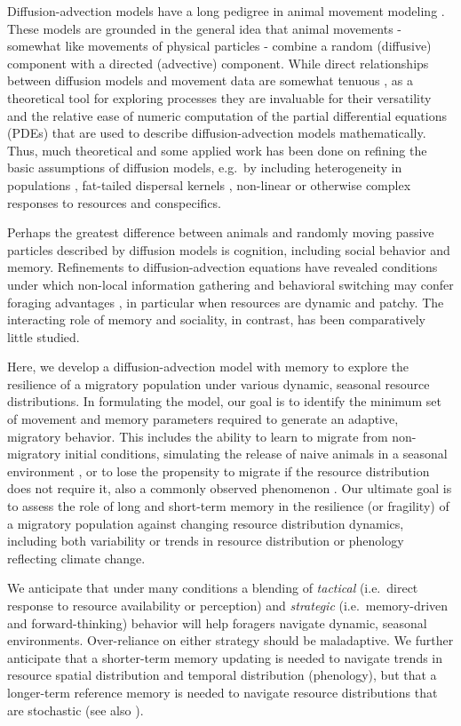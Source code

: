 \documentclass[12pt]{article}
\begin{document}
Diffusion-advection models have a long pedigree in animal movement modeling \citep{Skellam1951, Turchin1998, Okubo2001}. These models are grounded in the general idea that animal movements - somewhat like movements of physical particles - combine a random (diffusive) component with a directed (advective) component. While direct relationships between diffusion models and movement data are somewhat tenuous \citep{Gurarie2011}, as a theoretical tool for exploring processes they are invaluable for their versatility and the relative ease of numeric computation of the partial differential equations (PDEs) that are used to describe diffusion-advection models mathematically. Thus, much theoretical and some applied work has been done on refining the basic assumptions of diffusion models, e.g.~by including heterogeneity in populations \citep{Skalski2003, Gurarie2009}, fat-tailed dispersal kernels \citep{Kot1996}, non-linear or otherwise complex responses to resources and conspecifics.

Perhaps the greatest difference between animals and randomly moving passive particles described by diffusion models is cognition, including social behavior and memory. Refinements to diffusion-advection equations have revealed conditions under which non-local information gathering \citep{Fagan2017} and behavioral switching may confer foraging advantages \citep{Fagan2019}, in particular when resources are dynamic and patchy. The interacting role of memory and sociality, in contrast, has been comparatively little studied.

Here, we develop a diffusion-advection model with memory to explore the resilience of a migratory population under various dynamic, seasonal resource distributions. In formulating the model, our goal is to identify the minimum set of movement and memory parameters required to generate an adaptive, migratory behavior. This includes the ability to learn to migrate from non-migratory initial conditions, simulating the release of naive animals in a seasonal environment \citep{Jesmer2018}, or to lose the propensity to migrate if the resource distribution does not require it, also a commonly observed phenomenon \citep{Wilcove2008}. Our ultimate goal is to assess the role of long and short-term memory in the resilience (or fragility) of a migratory population against changing resource distribution dynamics, including both variability or trends in resource distribution or phenology reflecting climate change.

We anticipate that under many conditions a blending of \emph{tactical} (i.e.~direct response to resource availability or perception) and \emph{strategic} (i.e.~memory-driven and forward-thinking) behavior will help foragers navigate dynamic, seasonal environments. Over-reliance on either strategy should be maladaptive. We further anticipate that a shorter-term memory updating is needed to navigate trends in resource spatial distribution and temporal distribution (phenology), but that a longer-term reference memory is needed to navigate resource distributions that are stochastic (see also \citet{Lin2021}).
\end{document}
